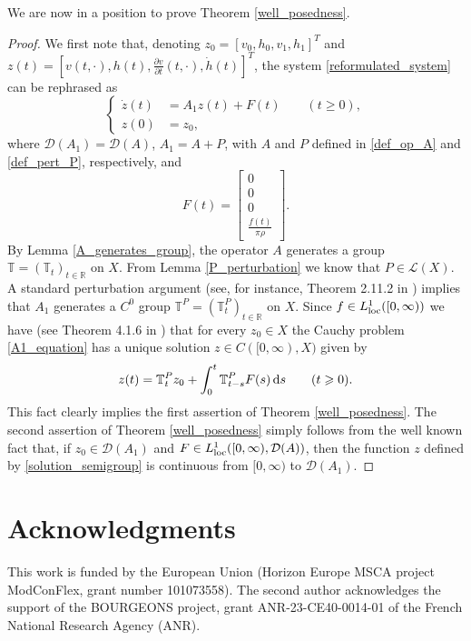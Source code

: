 \documentclass{amsart} %
\numberwithin{equation}{section}
\theoremstyle{definition}
\begin{document}
We are now in a position to prove Theorem \ref{well_posedness}.
\begingroup
\renewcommand{\proofname}{Proof of Theorem \ref{well_posedness} }
\begin{proof}
We first note that, denoting $z_0=[v_0,h_0,v_1,h_1]^T$ and  $z(t)=\left[v(t,\cdot),h(t),\frac{\partial v}{\partial t}(t,\cdot),\dot{h}(t)\right]^T$,
the system \eqref{reformulated_system} can be rephrased as
\begin{equation}\label{A1_equation}
\left\{
\begin{aligned}
\dot z(t) &= A_1z(t)+F(t)\qquad(t\geqslant 0),\\
z(0)&=z_0,
\end{aligned}
\right.
\end{equation}
where $\mathcal{D}(A_1)=\mathcal{D}(A)$, $A_1=A+P$, with $A$ and $P$ defined in \eqref{def_op_A} and \eqref{def_pert_P}, respectively, and 
\begin{equation}
    F(t)=\begin{bmatrix}0\\0\\0\\ \frac{f(t)}{\pi \rho}\end{bmatrix}.
\end{equation}
By Lemma \ref{A_generates_group}, the operator $A$ generates a group $\mathbb{T}=(\mathbb{T}_t)_{t\in\mathbb{R}}$ on $X$. 
From Lemma \ref{P_perturbation} we know that $P\in\mathcal{L}(X)$. A standard perturbation argument (see, for instance, Theorem 2.11.2 in \cite{Obs_book}) implies that $A_1$ generates a $C^0$ group $\mathbb{T}^P=(\mathbb{T}_t^P)_{t\in\mathbb{R}}$ on $X$. Since $f\in L_{{\rm loc}}^1([0,\infty))$ we have (see Theorem 4.1.6 in \cite{Obs_book}) that for every $z_0\in X$ the Cauchy problem \eqref{A1_equation} has a unique solution $z\in C([0,\infty),X)$ given by
\begin{equation}\label{solution_semigroup}
    z(t)=\mathbb{T}_t^Pz_0+\int_0^t\mathbb{T}_{t-s}^PF(s)\,{\rm d}s\qquad(t\geqslant 0).
\end{equation}
This fact clearly implies the first assertion of  Theorem \ref{well_posedness}. The second assertion of  Theorem \ref{well_posedness} simply follows from
the well known fact that, if $z_0\in \mathcal{D}(A_1)$ and $F\in L^1_{\rm loc}([0,\infty),\mathcal{D}(A))$, then the function $z$ defined by \eqref{solution_semigroup} is continuous from $[0,\infty)$ to $\mathcal{D}(A_1)$.
\end{proof}
\endgroup

\section*{Acknowledgments}
This work is funded by the European Union (Horizon Europe MSCA project ModConFlex, grant number 101073558). The second author acknowledges the support of the BOURGEONS project, grant ANR-23-CE40-0014-01 of the French National Research Agency (ANR).
\end{document}
